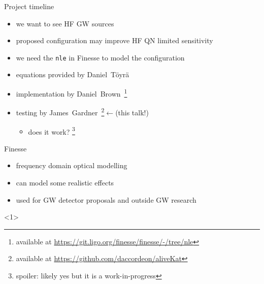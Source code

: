 \documentclass[12pt]{beamer}
\newcommand{\code}[1]{\texttt{#1}}
\begin{document}
\begin{frame}{Project timeline}
\begin{itemize}
\item we want to see HF GW sources
\item proposed configuration may improve HF QN limited sensitivity
\item we need the \code{nle} in Finesse to model the configuration
\item equations provided by Daniel~Töyrä
\item implementation by Daniel~Brown~\footnote{available at {\color{blue}\url{https://git.ligo.org/finesse/finesse/-/tree/nle}}}
\item testing by James~Gardner~\footnote{available at {\color{blue}\url{https://github.com/daccordeon/aliveKat}}}$\longleftarrow$(this talk!)
    \begin{itemize}
    \item does it work? \footnote{spoiler: likely yes but it is a work-in-progress}
    \end{itemize}
\end{itemize}
\end{frame}

\begin{frame}{Finesse}
\begin{itemize}
\item<1> frequency domain optical modelling 
\item<1> can model some realistic effects
\item<1> used for GW detector proposals and outside GW research
\end{itemize}
\begin{figure}
    \captionsetup[subfigure]{labelformat=empty}
    \centering 
    \qquad
\end{figure}
<1>
\end{frame}
\end{document}
